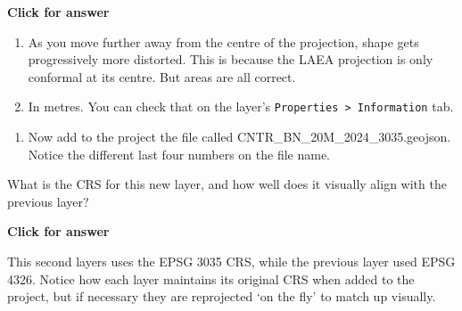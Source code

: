 \documentclass[
  letterpaper,
  DIV=11,
  numbers=noendperiod]{scrreprt}
\providecommand{\tightlist}{%
  \setlength{\itemsep}{0pt}\setlength{\parskip}{0pt}}\usepackage{longtable,booktabs,array}
\begin{document}
\begin{tcolorbox}[enhanced jigsaw, leftrule=.75mm, colframe=quarto-callout-important-color-frame, breakable, toprule=.15mm, bottomrule=.15mm, arc=.35mm, rightrule=.15mm, opacityback=0, colback=white, left=2mm]

\vspace{-3mm}\textbf{Click for answer}\vspace{3mm}

\begin{enumerate}
\def\labelenumi{\alph{enumi})}
\item
  As you move further away from the centre of the projection, shape gets
  progressively more distorted. This is because the LAEA projection is
  only conformal at its centre. But areas are all correct.
\item
  In metres. You can check that on the layer's
  \texttt{Properties\ \textgreater{}\ Information} tab.
\end{enumerate}

\end{tcolorbox}

\begin{enumerate}
\def\labelenumi{(\arabic{enumi})}
\setcounter{enumi}{58}
\tightlist
\item
  Now add to the project the file called
  CNTR\_BN\_20M\_2024\_3035.geojson. Notice the different last four
  numbers on the file name.
\end{enumerate}

\begin{tcolorbox}[enhanced jigsaw, breakable, toptitle=1mm, colback=white, left=2mm, leftrule=.75mm, titlerule=0mm, colframe=quarto-callout-important-color-frame, opacityback=0, title=\textcolor{quarto-callout-important-color}{\faExclamation}\hspace{0.5em}{Stop and Think}, toprule=.15mm, opacitybacktitle=0.6, bottomtitle=1mm, colbacktitle=quarto-callout-important-color!10!white, bottomrule=.15mm, coltitle=black, rightrule=.15mm, arc=.35mm]

What is the CRS for this new layer, and how well does it visually align
with the previous layer?

\end{tcolorbox}

\begin{tcolorbox}[enhanced jigsaw, leftrule=.75mm, colframe=quarto-callout-important-color-frame, breakable, toprule=.15mm, bottomrule=.15mm, arc=.35mm, rightrule=.15mm, opacityback=0, colback=white, left=2mm]

\vspace{-3mm}\textbf{Click for answer}\vspace{3mm}

This second layers uses the EPSG 3035 CRS, while the previous layer used
EPSG 4326. Notice how each layer maintains its original CRS when added
to the project, but if necessary they are reprojected `on the fly' to
match up visually.

\end{tcolorbox}
\end{document}
